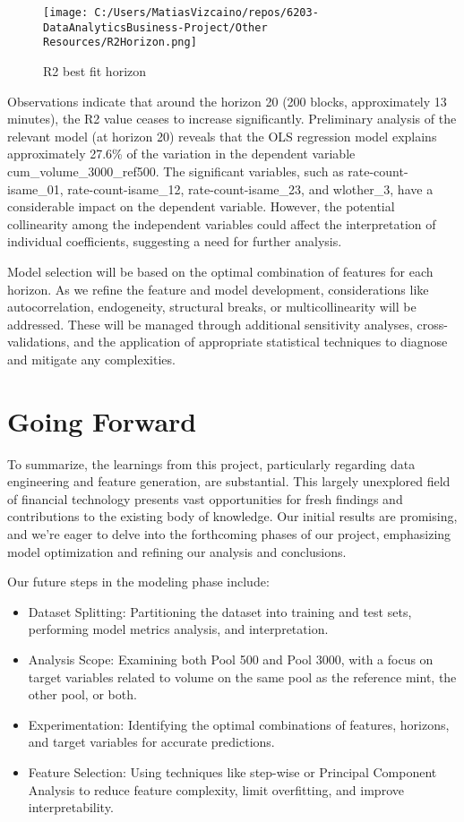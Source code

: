\documentclass{article}
\begin{document}
{\begin{wrapfigure}[16]{l}{0.35\textwidth}
\vspace{0pt} %
\centering
\texttt{[image: C:/Users/MatiasVizcaino/repos/6203-DataAnalyticsBusiness-Project/Other Resources/R2Horizon.png]}
\caption{R2 best fit horizon}
\label{fig:R2-horizon}
\end{wrapfigure}

Observations indicate that around the horizon 20 (200 blocks, approximately 13 minutes), the R2 value ceases to increase significantly. Preliminary analysis of the relevant model (at horizon 20) reveals that the OLS regression model explains approximately 27.6\% of the variation in the dependent variable cum\_volume\_3000\_ref500. The significant variables, such as rate-count-isame\_01, rate-count-isame\_12, rate-count-isame\_23, and wlother\_3, have a considerable impact on the dependent variable. However, the potential collinearity among the independent variables could affect the interpretation of individual coefficients, suggesting a need for further analysis.

Model selection will be based on the optimal combination of features for each horizon. As we refine the feature and model development, considerations like autocorrelation, endogeneity, structural breaks, or multicollinearity will be addressed. These will be managed through additional sensitivity analyses, cross-validations, and the application of appropriate statistical techniques to diagnose and mitigate any complexities.

\section*{Going Forward}

To summarize, the learnings from this project, particularly regarding data engineering and feature generation, are substantial. This largely unexplored field of financial technology presents vast opportunities for fresh findings and contributions to the existing body of knowledge. Our initial results are promising, and we're eager to delve into the forthcoming phases of our project, emphasizing model optimization and refining our analysis and conclusions.

Our future steps in the modeling phase include:

\begin{itemize}
\item Dataset Splitting: Partitioning the dataset into training and test sets, performing model metrics analysis, and interpretation.
\item Analysis Scope: Examining both Pool 500 and Pool 3000, with a focus on target variables related to volume on the same pool as the reference mint, the other pool, or both.
\item Experimentation: Identifying the optimal combinations of features, horizons, and target variables for accurate predictions.
\item Feature Selection: Using techniques like step-wise or Principal Component Analysis to reduce feature complexity, limit overfitting, and improve interpretability.
\end{itemize}

}
\end{document}
